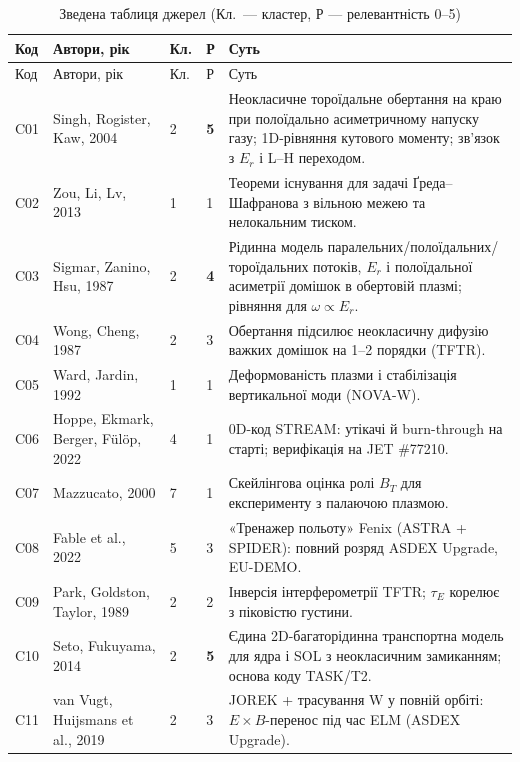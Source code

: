 \documentclass[11pt,a4paper]{article}
\newcommand{\rel}[1]{\textbf{#1}}
\begin{document}
\begin{longtable}{@{}p{0.9cm}>{\raggedright\arraybackslash}p{4.3cm}p{0.6cm}p{0.5cm}>{\raggedright\arraybackslash}p{8.6cm}@{}}
\caption{Зведена таблиця джерел (Кл.\ --- кластер, Р --- релевантність 0--5)}
\label{tab:all}\\
\toprule
Код & Автори, рік & Кл. & Р & Суть \\
\midrule
\endfirsthead
\toprule
Код & Автори, рік & Кл. & Р & Суть \\
\midrule
\endhead
\bottomrule
\endfoot
C01 & Singh, Rogister, Kaw, 2004 \cite{Singh2004} & 2 & \rel{5} &
  Неокласичне тороїдальне обертання на краю при полоїдально асиметричному напуску
  газу; 1D-рівняння кутового моменту; зв'язок з $E_r$ і L--H переходом. \\
C02 & Zou, Li, Lv, 2013 \cite{Zou2013} & 1 & 1 &
  Теореми існування для задачі Ґреда--Шафранова з вільною межею та нелокальним тиском. \\
C03 & Sigmar, Zanino, Hsu, 1987 \cite{Sigmar1987} & 2 & \rel{4} &
  Рідинна модель паралельних/полоїдальних/тороїдальних потоків, $E_r$ і полоїдальної
  асиметрії домішок в обертовій плазмі; рівняння для $\omega\propto E_r$. \\
C04 & Wong, Cheng, 1987 \cite{Wong1987} & 2 & 3 &
  Обертання підсилює неокласичну дифузію важких домішок на 1--2 порядки (TFTR). \\
C05 & Ward, Jardin, 1992 \cite{Ward1992} & 1 & 1 &
  Деформованість плазми і стабілізація вертикальної моди (NOVA-W). \\
C06 & Hoppe, Ekmark, Berger, Fülöp, 2022 \cite{Hoppe2022} & 4 & 1 &
  0D-код STREAM: утікачі й burn-through на старті; верифікація на JET \#77210. \\
C07 & Mazzucato, 2000 \cite{Mazzucato2000} & 7 & 1 &
  Скейлінгова оцінка ролі $B_T$ для експерименту з палаючою плазмою. \\
C08 & Fable et al., 2022 \cite{Fable2022} & 5 & 3 &
  «Тренажер польоту» Fenix (ASTRA + SPIDER): повний розряд ASDEX Upgrade, EU-DEMO. \\
C09 & Park, Goldston, Taylor, 1989 \cite{Park1989} & 2 & 2 &
  Інверсія інтерферометрії TFTR; $\tau_E$ корелює з піковістю густини. \\
C10 & Seto, Fukuyama, 2014 \cite{Seto2014} & 2 & \rel{5} &
  Єдина 2D-багаторідинна транспортна модель для ядра і SOL з неокласичним
  замиканням; основа коду TASK/T2. \\
C11 & van Vugt, Huijsmans et al., 2019 \cite{vanVugt2019} & 2 & 3 &
  JOREK + трасування W у повній орбіті: $E\times B$-перенос під час ELM (ASDEX Upgrade). \\

\end{longtable}
\end{document}
